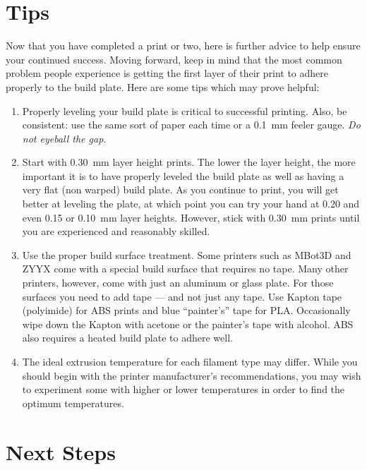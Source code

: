 
\section{Tips}

Now that you have completed a print or two, here is further advice to help ensure your continued success.  Moving forward, keep in mind
that the most common problem people experience is getting the first layer
of their print to adhere properly to the build plate.  Here are some tips
which may prove helpful:

\begin{enumerate}
\item Properly leveling your build plate is critical to successful
printing.  Also, be consistent: use the same sort of paper each time or a
0.1~mm feeler gauge.  \emph{Do not eyeball the gap.}
\item Start with 0.30~mm layer height prints.  The lower the layer height, the
more important it is to have properly leveled the build plate as well as having a very flat
(non warped) build plate.  As you continue to print, you will get better
at leveling the plate, at which point you can try your hand at 0.20 and even 0.15 or
0.10~mm layer heights.  However, stick with 0.30~mm prints until you are experienced and reasonably skilled.
\item Use the proper build surface treatment.  Some printers such as MBot3D
and ZYYX come with a special build surface that requires no tape. Many other
printers, however, come with just an aluminum or glass plate.  For those
surfaces you need to add tape --- and not just any tape.  Use Kapton tape
(polyimide) for ABS prints and blue ``painter's'' tape for PLA.  Occasionally
wipe down the Kapton with acetone or the painter's tape with alcohol.  ABS
also requires a heated build plate to adhere well.
\item The ideal extrusion temperature for each filament type may differ.  While you should begin with the printer manufacturer's recommendations, you may wish to experiment some with higher or lower temperatures in order to find the optimum temperatures.
\end{enumerate}


\section{Next Steps}

